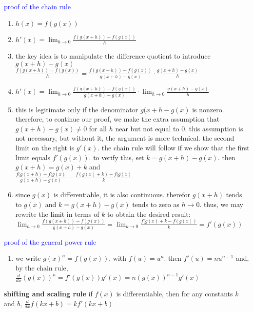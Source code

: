 \documentclass{article}
\begin{document}
\textcolor{blue}{proof of the chain rule}
	\begin{enumerate}
		\item $h(x) = f(g(x))$
		\item $h'(x) = \lim_{h \to 0}\frac{f(g(x + h)) - f(g(x))}{h}$
		\item the key idea is to manipulate the difference quotient to introduce $g(x + h) - g(x)$\\ $\frac{f(g(x + h)) = f(g(x))}{h} = \frac{f(g(x + h)) - f(g(x))}{g(x + h) - g(x)} \cdot \frac{g(x + h) - g(x)}{h}$
		\item $h'(x) = \lim_{h \to 0}\frac{f(g(x + h)) - f(g(x))}{g(x + h) - g(x)} \cdot \lim_{h \to 0}\frac{g(x + h) - g(x)}{h}$
		\item this is legitimate only if the denominator $g(x + h - g(x)$ is nonzero. therefore, to continue our proof, we make the extra assumption that $g(x + h) - g(x) \neq 0$ for all $h$ near but not equal to 0. this assumption is not necessary, but without it, the argument is more technical. the second limit on the right is $g'(x)$. the chain rule will follow if we show that the first limit equals $f'(g(x))$. to verify this, set $k = g(x + h) - g(x)$. then $g(x + h) = g(x) + k$ and\\ $\frac{f(g(x + h) - f(g(x)}{g(x + h) - g(x)} = \frac{f(g(x) + k) - f(g(x)}{k}$
		\item since $g(x)$ is differentiable, it is also continuous. therefor $g(x + h)$ tends to $g(x)$ and $k = g(x + h) - g(x)$ tends to zero as $h \to 0$. thus, we may rewrite the limit in terms of $k$ to obtain the desired result:\\ $\lim_{h \to 0}\frac{f(g(x + h)) - f(g(x))}{g(x + h) - g(x)} = \lim_{k \to 0}\frac{f(g(x) + k - f(g(x))}{k} = f'(g(x))$
	\end{enumerate}

\textcolor{blue}{proof of the general power rule}
	\begin{enumerate}
		\item we write $g(x)^n = f(g(x))$, with $f(u) = u^n$. then $f'(u) = nu^{n - 1}$ and, by the chain rule,\\ $\frac{d}{dx}(g(x))^n = f'(g(x))g'(x) = n(g(x))^{n - 1}g'(x)$
	\end{enumerate}

\textbf{shifting and scaling rule} if $f(x)$ is differentiable, then for any constants $k$ and $b$, $\frac{d}{dx}f(kx + b) = kf'(kx + b)$\\
\end{document}
